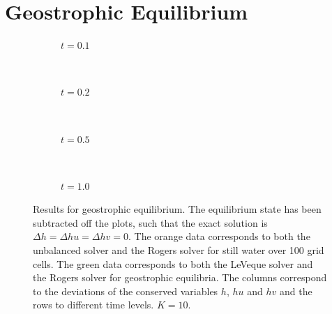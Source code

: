 \section{Geostrophic Equilibrium}

\begin{figure}
  \centering
  \begin{subfigure}{\textwidth}
    \caption{$t = 0.1$}
    \label{fig:results-geo-1}
  \end{subfigure} \\
  \begin{subfigure}{\textwidth}
    \caption{$t = 0.2$}
    \label{fig:results-geo-2}
  \end{subfigure} \\
  \begin{subfigure}{\textwidth}
    \caption{$t = 0.5$}
    \label{fig:results-geo-5}
  \end{subfigure} \\
  \begin{subfigure}{\textwidth}
    \caption{$t = 1.0$}
    \label{fig:results-geo-10}
  \end{subfigure}
  \caption{Results for geostrophic equilibrium. The equilibrium state has been subtracted off the plots, such that the exact solution is $\Delta h = \Delta hu = \Delta hv = 0$. The orange data corresponds to both the unbalanced solver and the Rogers solver for still water over 100 grid cells. The green data corresponds to both the LeVeque solver and the Rogers solver for geostrophic equilibria. The columns correspond to the deviations of the conserved variables $h$, $hu$ and $hv$ and the rows to different time levels. $K = 10$.}
  \label{fig:results-geo}
\end{figure}

